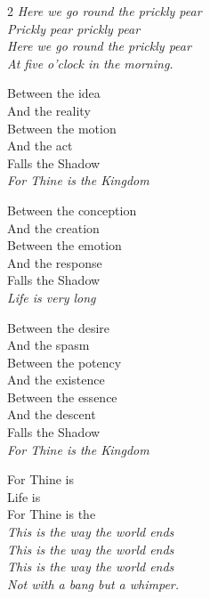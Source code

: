 \documentclass[10pt,a4paper]{article}
\begin{document}
\begin{multicols}{2}
\emph{Here we go round the prickly pear\\
Prickly pear prickly pear\\
Here we go round the prickly pear\\
At five o’clock in the morning.\\}

Between the idea\\
And the reality\\
Between the motion\\
And the act\\
Falls the Shadow\\
\mbox{}\hspace{2cm}\emph{For Thine is the Kingdom}

Between the conception\\
And the creation\\
Between the emotion\\
And the response\\
Falls the Shadow\\
\mbox{}\hspace{2cm}\emph{Life is very long}

Between the desire\\
And the spasm\\
Between the potency\\
And the existence\\
Between the essence\\
And the descent\\
Falls the Shadow\\
\mbox{}\hspace{2cm}\emph{For Thine is the Kingdom}

For Thine is\\
Life is\\
For Thine is the\\

\emph{This is the way the world ends\\
This is the way the world ends\\
This is the way the world ends\\
Not with a bang but a whimper.}
	
\end{multicols}

\clearpage
\end{document}
